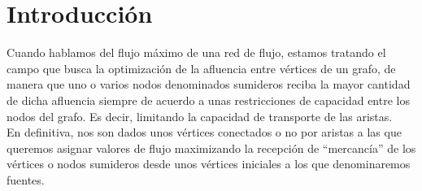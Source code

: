 \section{Introducción}
Cuando hablamos del flujo máximo de una red de flujo, estamos tratando el campo que busca la optimización de la afluencia entre vértices de un grafo, de manera que uno o varios nodos denominados sumideros reciba la mayor cantidad de dicha afluencia siempre de acuerdo a unas restricciones de capacidad entre los nodos del grafo. Es decir, limitando la capacidad de transporte de las aristas.\\

En definitiva, nos son dados unos vértices conectados o no por aristas a las que queremos asignar valores de flujo maximizando la recepción de ``mercancía'' de los vértices o nodos sumideros desde unos vértices iniciales a los que denominaremos fuentes.

